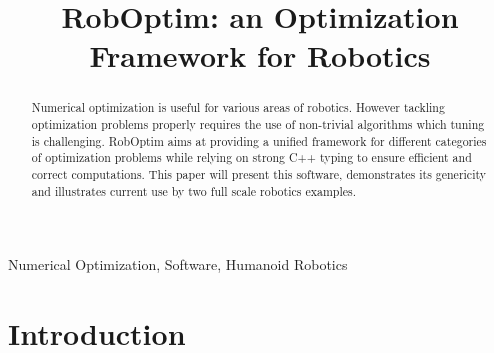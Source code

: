 \documentclass[conference,final,a4paper,twocolumn,9pt]{IEEEtran}
\begin{document}
\title{RobOptim: an Optimization Framework for Robotics}
%
\author{%
%
%
%
%
}%
%
\maketitle

\begin{abstract}
\boldmath Numerical optimization is useful for various areas of
robotics. However tackling optimization problems properly requires the
use of non-trivial algorithms which tuning is challenging. RobOptim
aims at providing a unified framework for different categories of
optimization problems while relying on strong C++ typing to ensure
efficient and correct computations. This paper will present this
software, demonstrates its genericity and illustrates current use by two
full scale robotics examples.
\end{abstract}

\begin{IEEEkeywords}
  Numerical Optimization, Software, Humanoid Robotics
\end{IEEEkeywords}

\IEEEpeerreviewmaketitle

\section{Introduction}\label{sec:introduction}
\end{document}
